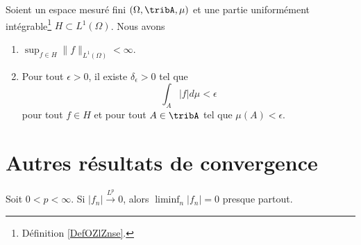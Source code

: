 \begin{theorem}	\label{THOooGLYJooCbNysA}
	Soient un espace mesuré fini \( (\Omega,\tribA,\mu)\) et une partie uniformément intégrable\footnote{Définition \ref{DefOZlZnse}.} \( H\subset L^1(\Omega)\). Nous avons
	\begin{enumerate}
		\item		\label{ITEMooCAIFooHXOKQb}
		      \( \sup_{f\in H}\| f \|_{L^1(\Omega)}<\infty\).
		\item
		      Pour tout \( \epsilon>0\), il existe \( \delta_{\epsilon}>0\) tel que
		      \begin{equation}
			      \int_A| f |d\mu<\epsilon
		      \end{equation}
		      pour tout \( f\in H\) et pour tout \( A\in\tribA\) tel que \( \mu(A)<\epsilon\).
	\end{enumerate}
\end{theorem}


\section{Autres résultats de convergence}


\begin{proposition}	\label{PROPooGJBIooAYsZQL}
	Soit \( 0<p<\infty\). Si \( | f_n |\stackrel{ L^p}{\longrightarrow} 0\), alors \( \liminf_n| f_n |=0\) presque partout.
\end{proposition}

